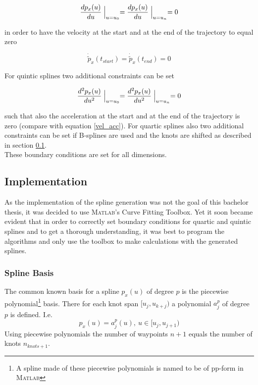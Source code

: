 \begin{equation*}
\frac{dp_x(u)}{du} \Bigm|_{u=u_0} = \frac{dp_x(u)}{du} \Bigm|_{u=u_n}=0
\end{equation*}

in order to have the velocity at the start and at the end of the trajectory to equal zero

\begin{equation*}
\dot{\tilde{p}}_x(t_{start}) = \dot{\tilde{p}}_x(t_{end})=0
\end{equation*}

For quintic splines two additional constraints can be set

\begin{equation*}
\frac{d^2p_x(u)}{du^2} \Bigm|_{u=u_0} = \frac{d^2p_x(u)}{du^2} \Bigm|_{u=u_n}=0
\end{equation*}

such that also the acceleration at the start and at the end of the trajectory is zero (compare with equation \eqref{vel_acc}). For quartic splines also two additional constraints can be set if B-splines are used and the knots are shifted as described in section \ref{subsec:implementation}. \\
These boundary conditions are set for all dimensions.



\subsection{Implementation}
\label{subsec:implementation}
As the implementation of the spline generation was not the goal of this bachelor thesis, it was decided to use \textsc{Matlab}'s Curve Fitting Toolbox. Yet it soon became evident that in order to correctly set boundary conditions for quartic and quintic splines and to get a thorough understanding, it was best to program the algorithms and only use the toolbox to make calculations with the generated splines.\\

\subsubsection{Spline Basis}
The common known basis for a spline $p_x(u)$ of degree $p$ is the piecewise polynomial\footnote{A spline made of these piecewise polynomials is named to be of pp-form in \textsc{Matlab}} basis. There for each knot span $[u_j, u_{k+j})$ a polynomial $a_j^p$ of degree $p$ is defined. I.e. 
\begin{equation}
p_x(u)=a_j^p(u),~u \in [u_j,u_{j+1})
\end{equation}
Using piecewise polynomials the number of waypoints $n+1$ equals the number of knots $n_{knots+1}$.


